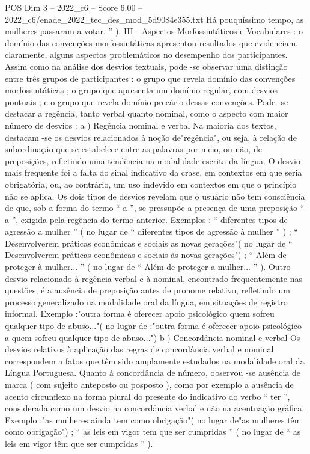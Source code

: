 \begin{textsample}{POS Dim 3 – 2022\_c6 – Score 6.00 – 2022\_c6/enade\_2022\_tec\_des\_mod\_5d9084e355.txt}
Há pouquíssimo tempo, as mulheres passaram a votar. ” ).
III - Aspectos Morfossintáticos e Vocabulares : o domínio das convenções morfossintáticas apresentou resultados que evidenciam, claramente, alguns aspectos problemáticos no desempenho dos participantes.
Assim como na análise dos desvios textuais, pode -se observar uma distinção entre três grupos de participantes : o grupo que revela domínio das convenções morfossintáticas ; o grupo que apresenta um domínio regular, com desvios pontuais ; e o grupo que revela domínio precário dessas convenções.
Pode -se destacar a regência, tanto verbal quanto nominal, como o aspecto com maior número de desvios : a ) Regência nominal e verbal Na maioria dos textos, destacam -se os desvios relacionados à noção de"regência", ou seja, à relação de subordinação que se estabelece entre as palavras por meio, ou não, de preposições, refletindo uma tendência na modalidade escrita da língua.
O desvio mais frequente foi a falta do sinal indicativo da crase, em contextos em que seria obrigatória, ou, ao contrário, um uso indevido em contextos em que o princípio não se aplica.
Os dois tipos de desvios revelam que o usuário não tem consciência de que, sob a forma do termo “ a ”, se pressupõe a presença de uma preposição “ a ”, exigida pela regência do termo anterior.
Exemplos : “ diferentes tipos de agressão a mulher ” ( no lugar de “ diferentes tipos de agressão à mulher ” ) ; “ Desenvolverem práticas econômicas e sociais as novas gerações"( no lugar de “ Desenvolverem práticas econômicas e sociais às novas gerações") ; “ Além de proteger à mulher... ” ( no lugar de “ Além de proteger a mulher... ” ).
Outro desvio relacionado à regência verbal e à nominal, encontrado frequentemente nas questões, é a ausência de preposição antes de pronome relativo, refletindo um processo generalizado na modalidade oral da língua, em situações de registro informal.
Exemplo :"outra forma é oferecer apoio psicológico quem sofreu qualquer tipo de abuso..."( no lugar de :"outra forma é oferecer apoio psicológico a quem sofreu qualquer tipo de abuso...") b ) Concordância nominal e verbal Os desvios relativos à aplicação das regras de concordância verbal e nominal correspondem a fatos que têm sido amplamente estudados na modalidade oral da Língua Portuguesa.
Quanto à concordância de número, observou -se ausência de marca ( com sujeito anteposto ou posposto ), como por exemplo a ausência de acento circunflexo na forma plural do presente do indicativo do verbo “ ter ”, considerada como um desvio na concordância verbal e não na acentuação gráfica.
Exemplo :"as mulheres ainda tem como obrigação"( no lugar de"as mulheres têm como obrigação") ; “ as leis em vigor tem que ser cumpridas ” ( no lugar de “ as leis em vigor têm que ser cumpridas ” ).

\end{textsample}
